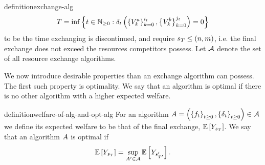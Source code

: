 \begin{restatable}[Algorithm]{definition}{exchange-alg}
{    %
    \[
        T
        =\inf\left\{
            t\in\mathbb{N}_{\geq 0} :
            \delta_{t}\left(
                \left\{
                    V^a_{k}
                \right\}_{k=0}^{i_{t}}
                ,
                \left\{
                    V^b_{k}
                \right\}_{k=0}^{j_{t}}
            \right)=0
        \right\}
    \] 
    to be the time exchanging is discontinued, 
    and require
    \(
        s_{
            T
        }
        \leq (n,m)
    \), i.e. the final exchange does not exceed the resources competitors possess.
    Let $\mathcal{A}$ denote the set of all resource exchange algorithms. }
\end{restatable}


We now introduce desirable properties than an exchange algorithm can possess. The first such property is optimality. 
We say that an algorithm is optimal if there is no other algorithm with a higher expected welfare.

\begin{restatable}{definition}{welfare-of-alg-and-opt-alg}
    For an algorithm
    \(
        A
        =
        \left(
            \left\{
                f_{t}
            \right\}_{t\geq 0}, 
            \left\{
                \delta_{t}
            \right\}_{t\geq 0}
        \right)
        \in\mathcal{A}
    \)
    we define its expected welfare to be that of the final exchange,
    \(
        \mathbb{E}\left[
            Y_{
                s_{T}
            }
        \right]
    \).
    We say that an algorithm $A$ is optimal if
    \begin{align*}
        \mathbb{E}\left[
            Y_{
                s_{T}
            }
        \right]
        =
        \sup_{
            A'\in\mathcal{A}
        }
        \mathbb{E}\left[
            Y_{
                s_{T'}'
            }
        \right] .
    \end{align*} 
\end{restatable}  

